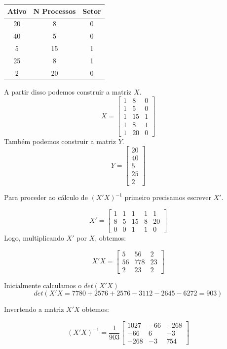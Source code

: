\begin{center}
	\begin{tabular}{|c|c|c|}
		\hline
		Ativo & N Processos & Setor \\ \hline
		20    & 8           & 0     \\ \hline
		40    & 5           & 0     \\ \hline
		5     & 15          & 1     \\ \hline
		25    & 8           & 1     \\ \hline
		2     & 20          & 0     \\ \hline
	\end{tabular}
\end{center}

A partir disso podemos construir a matriz \(X\).
\[ X =
	\begin{bmatrix}
		1 & 8  & 0 \\
		1 & 5  & 0 \\
		1 & 15 & 1 \\
		1 & 8  & 1 \\
		1 & 20 & 0
	\end{bmatrix}
\]
Também podemos construir a matriz \(Y\).
\[ Y =
	\begin{bmatrix}
		20 \\
		40 \\
		5  \\
		25 \\
		2
	\end{bmatrix}
\]

Para proceder ao cálculo de \((X'X)^{-1}\) primeiro precisamos escrever \(X'\).

\[
	X' =
	\begin{bmatrix}
		1 & 1 & 1  & 1 & 1  \\
		8 & 5 & 15 & 8 & 20 \\
		0 & 0 & 1  & 1 & 0
	\end{bmatrix}
\]
Logo, multiplicando \(X'\) por \(X\), obtemos:

\[
	X'X =
	\begin{bmatrix}
		5  & 56  & 2  \\
		56 & 778 & 23 \\
		2  & 23  & 2
	\end{bmatrix}
\]

Inicialmente calculamos o \(det(X'X)\)
\[det(X'X = 7780 + 2576 + 2576 - 3112 - 2645 - 6272 = 903 )\]

Invertendo a matriz \(X'X\) obtemos:

\[
	(X'X)^{-1} = \frac{1}{903}
	\begin{bmatrix}
		1027 & -66 & -268 \\
		-66  & 6   & -3   \\
		-268 & -3  & 754
	\end{bmatrix}
\]

